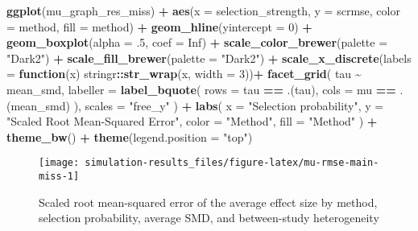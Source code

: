 \documentclass[
]{article}
\newenvironment{Shaded}{\begin{snugshade}}{\end{snugshade}}
\newcommand{\AttributeTok}[1]{\textcolor[rgb]{0.13,0.29,0.53}{#1}}
\newcommand{\ConstantTok}[1]{\textcolor[rgb]{0.56,0.35,0.01}{#1}}
\newcommand{\ControlFlowTok}[1]{\textcolor[rgb]{0.13,0.29,0.53}{\textbf{#1}}}
\newcommand{\DecValTok}[1]{\textcolor[rgb]{0.00,0.00,0.81}{#1}}
\newcommand{\FunctionTok}[1]{\textcolor[rgb]{0.13,0.29,0.53}{\textbf{#1}}}
\newcommand{\NormalTok}[1]{#1}
\newcommand{\SpecialCharTok}[1]{\textcolor[rgb]{0.81,0.36,0.00}{\textbf{#1}}}
\newcommand{\StringTok}[1]{\textcolor[rgb]{0.31,0.60,0.02}{#1}}
\begin{document}
\begin{Shaded}
\begin{Highlighting}[]
\FunctionTok{ggplot}\NormalTok{(mu\_graph\_res\_miss) }\SpecialCharTok{+} 
  \FunctionTok{aes}\NormalTok{(}\AttributeTok{x =}\NormalTok{ selection\_strength, }\AttributeTok{y =}\NormalTok{ scrmse, }\AttributeTok{color =}\NormalTok{ method, }\AttributeTok{fill =}\NormalTok{ method) }\SpecialCharTok{+}
  \FunctionTok{geom\_hline}\NormalTok{(}\AttributeTok{yintercept =} \DecValTok{0}\NormalTok{) }\SpecialCharTok{+}
  \FunctionTok{geom\_boxplot}\NormalTok{(}\AttributeTok{alpha =}\NormalTok{ .}\DecValTok{5}\NormalTok{, }\AttributeTok{coef =} \ConstantTok{Inf}\NormalTok{) }\SpecialCharTok{+}
  \FunctionTok{scale\_color\_brewer}\NormalTok{(}\AttributeTok{palette =} \StringTok{"Dark2"}\NormalTok{) }\SpecialCharTok{+}
  \FunctionTok{scale\_fill\_brewer}\NormalTok{(}\AttributeTok{palette =} \StringTok{"Dark2"}\NormalTok{) }\SpecialCharTok{+}
  \FunctionTok{scale\_x\_discrete}\NormalTok{(}\AttributeTok{labels =} \ControlFlowTok{function}\NormalTok{(x) stringr}\SpecialCharTok{::}\FunctionTok{str\_wrap}\NormalTok{(x, }\AttributeTok{width =} \DecValTok{3}\NormalTok{))}\SpecialCharTok{+}
  \FunctionTok{facet\_grid}\NormalTok{(}
\NormalTok{    tau }\SpecialCharTok{\textasciitilde{}}\NormalTok{ mean\_smd, }
    \AttributeTok{labeller =} \FunctionTok{label\_bquote}\NormalTok{(}
      \AttributeTok{rows =}\NormalTok{ tau }\SpecialCharTok{==}\NormalTok{ .(tau),}
      \AttributeTok{cols =}\NormalTok{ mu }\SpecialCharTok{==}\NormalTok{ .(mean\_smd)}
\NormalTok{    ),}
    \AttributeTok{scales =} \StringTok{"free\_y"}
\NormalTok{  ) }\SpecialCharTok{+}
  \FunctionTok{labs}\NormalTok{(}
    \AttributeTok{x =} \StringTok{"Selection probability"}\NormalTok{, }
    \AttributeTok{y =} \StringTok{"Scaled Root Mean{-}Squared Error"}\NormalTok{, }
    \AttributeTok{color =} \StringTok{"Method"}\NormalTok{,}
    \AttributeTok{fill =} \StringTok{"Method"}
\NormalTok{  ) }\SpecialCharTok{+} 
  \FunctionTok{theme\_bw}\NormalTok{() }\SpecialCharTok{+}
  \FunctionTok{theme}\NormalTok{(}\AttributeTok{legend.position =} \StringTok{"top"}\NormalTok{)}
\end{Highlighting}
\end{Shaded}

\begin{sidewaysfigure}
\texttt{[image: simulation-results\_files/figure-latex/mu-rmse-main-miss-1]} \caption{Scaled root mean-squared error of the average effect size by method, selection probability, average SMD, and between-study heterogeneity}\label{fig:mu-rmse-main-miss}
\end{sidewaysfigure}
\end{document}
